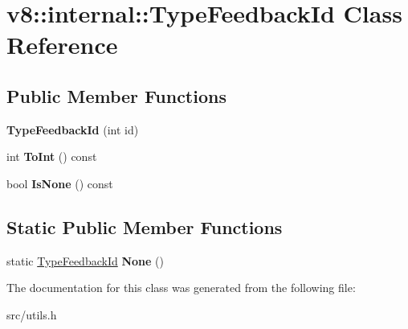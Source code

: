 \hypertarget{classv8_1_1internal_1_1_type_feedback_id}{}\section{v8\+:\+:internal\+:\+:Type\+Feedback\+Id Class Reference}
\label{classv8_1_1internal_1_1_type_feedback_id}
\subsection*{Public Member Functions}
\begin{DoxyCompactItemize}
\item 
\hypertarget{classv8_1_1internal_1_1_type_feedback_id_a2315c0f9b1c764dd6f166a884ff624af}{}{\bfseries Type\+Feedback\+Id} (int id)\label{classv8_1_1internal_1_1_type_feedback_id_a2315c0f9b1c764dd6f166a884ff624af}

\item 
\hypertarget{classv8_1_1internal_1_1_type_feedback_id_a7e49e6953650d12499d41d715e95f413}{}int {\bfseries To\+Int} () const \label{classv8_1_1internal_1_1_type_feedback_id_a7e49e6953650d12499d41d715e95f413}

\item 
\hypertarget{classv8_1_1internal_1_1_type_feedback_id_aedd453180b339ad171593afec6c765e3}{}bool {\bfseries Is\+None} () const \label{classv8_1_1internal_1_1_type_feedback_id_aedd453180b339ad171593afec6c765e3}

\end{DoxyCompactItemize}
\subsection*{Static Public Member Functions}
\begin{DoxyCompactItemize}
\item 
\hypertarget{classv8_1_1internal_1_1_type_feedback_id_a301d6c3d35acdf2cd4090d452bb6457f}{}static \hyperlink{classv8_1_1internal_1_1_type_feedback_id}{Type\+Feedback\+Id} {\bfseries None} ()\label{classv8_1_1internal_1_1_type_feedback_id_a301d6c3d35acdf2cd4090d452bb6457f}

\end{DoxyCompactItemize}


The documentation for this class was generated from the following file\+:\begin{DoxyCompactItemize}
\item 
src/utils.\+h\end{DoxyCompactItemize}
